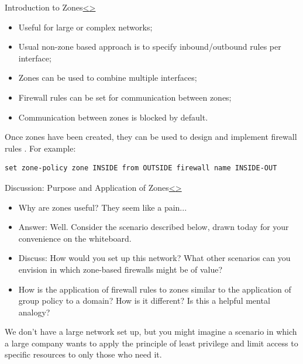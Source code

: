 \documentclass[12pt]{article}
\newenvironment{instructionblock}{\Large\bgroup}{\egroup}
\begin{document}
\newpage
\begin{slide}{Introduction to Zones}{\hyperref[slide 11]{\textless}\hyperref[slide 13]{\textgreater}}
\begin{instructionblock}
\begin{itemize}
\item Useful for large or complex networks;
\item Usual non-zone based approach is to specify inbound/outbound rules per interface;
\item Zones can be used to combine multiple interfaces;
\item Firewall rules can be set for communication between zones;
\item Communication between zones is blocked by default.
\end{itemize}
\end{instructionblock}
\end{slide}
\par Once zones have been created, they can be used to design and implement firewall rules \cite{zonebasedfw}. For example:
\begin{lstlisting}
set zone-policy zone INSIDE from OUTSIDE firewall name INSIDE-OUT
\end{lstlisting}


\pagebreak
\begin{slide}{Discussion: Purpose and Application of Zones}{\hyperref[slide 12]{\textless}\hyperref[slide 14]{\textgreater}}
\begin{instructionblock}
\begin{itemize}
\item Why are zones useful? They seem like a pain...
\item Answer: Well. Consider the scenario described below, drawn today for your convenience on the whiteboard.
\item Discuss: How would you set up this network? What other scenarios can you envision in which zone-based firewalls might be of value?
\item How is the application of firewall rules to zones similar to the application of group policy to a domain? How is it different? Is this a helpful mental analogy?
\end{itemize}
\end{instructionblock}
\end{slide}

\par We don't have a large network set up, but you might imagine a scenario in which a large company wants to apply the principle of least privilege and limit access to specific resources to only those who need it. 
\end{document}
